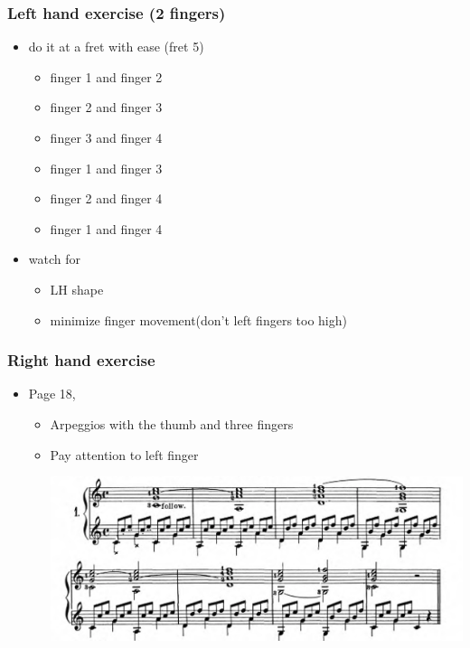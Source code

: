 \documentclass[11pt]{article}
\begin{document}
\subsubsection*{Left hand exercise (2 fingers)}
\label{sec:org4b7889d}
\begin{itemize}
\item do it at a fret with ease (fret 5)
\begin{itemize}
\item finger 1 and finger 2
\item finger 2 and finger 3
\item finger 3 and finger 4
\item finger 1 and finger 3
\item finger 2 and finger 4
\item finger 1 and finger 4
\end{itemize}
\item watch for
\begin{itemize}
\item LH shape
\item minimize finger movement(don't left fingers too high)
\end{itemize}
\end{itemize}
\subsubsection*{Right hand exercise}
\label{sec:orgb24f0af}
\begin{itemize}
\item Page 18,
\begin{itemize}
\item Arpeggios with the thumb and three fingers
\item Pay attention to left finger
\begin{center}
\includegraphics[width=.9\linewidth]{./Handouts.org_20240215_164708.png}
\end{center}
\end{itemize}
\end{itemize}
\end{document}
